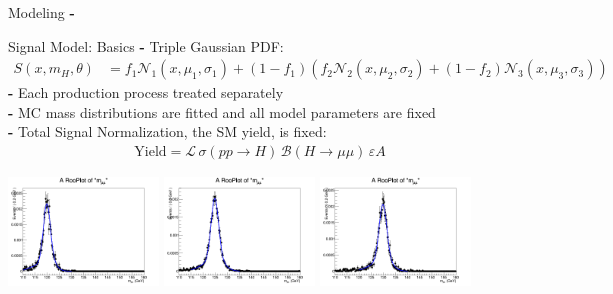 \documentclass[pdf, 9pt]{beamer}
\begin{document}

  \begin{frame}{Modeling}
    \textbf{-}
  \end{frame}

  \begin{frame}{Signal Model: Basics}
        \textbf{-} Triple Gaussian PDF:\\\vspace{-0.4cm}
        \begin{align}
          S(x, m_{H}, \theta) &= f_{1} \mathcal{N}_{1}(x, \mu_{1}, \sigma_{1}) + (1-f_{1}) \left(f_{2} \mathcal{N}_{2}(x, \mu_{2}, \sigma_{2}) + (1-f_{2}) \mathcal{N}_{3}(x, \mu_{3}, \sigma_{3})\right)
        \end{align}
        \textbf{-} Each production process treated separately\\\vspace{0.2cm}
        \textbf{-} MC mass distributions are fitted and all model parameters are fixed\\\vspace{0.2cm}
        \textbf{-} Total Signal Normalization, the SM yield, is fixed:\\\vspace{-0.4cm}
        \begin{align}
          \text{Yield} = \mathcal{L}\,\sigma(pp\rightarrow H)\, \mathcal{B}(H \rightarrow \mu\mu) \, \varepsilon A
        \end{align}
        \begin{center}
        \includegraphics[width=0.3\textwidth, height=0.3\textheight]{figs/higgs/signalmodel/bdt/bdt_110to160_withSys/signalFit__c0__120__GluGlu__TripleGaus__default.png}
        \includegraphics[width=0.3\textwidth, height=0.3\textheight]{figs/higgs/signalmodel/bdt/bdt_110to160_withSys/signalFit__c0__125__GluGlu__TripleGaus__default.png}
        \includegraphics[width=0.3\textwidth, height=0.3\textheight]{figs/higgs/signalmodel/bdt/bdt_110to160_withSys/signalFit__c0__130__GluGlu__TripleGaus__default.png}
        \end{center}
  \end{frame}
\end{document}
